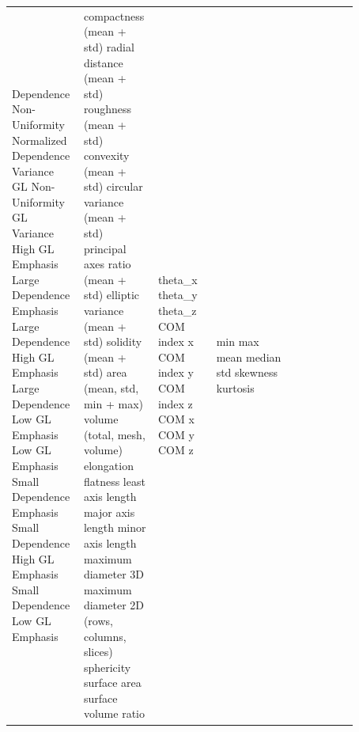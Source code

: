 \begin{table}
\begin{tabular}{@{}P{0.16\linewidth}P{0.16\linewidth}P{0.16\linewidth}P{0.21\linewidth}P{0.09\linewidth}P{0.09\linewidth}@{}}
Dependence Non-Uniformity Normalized \newline Dependence Variance \newline GL Non-Uniformity \newline GL Variance \newline High GL Emphasis \newline Large Dependence Emphasis \newline Large Dependence High GL Emphasis \newline Large Dependence Low GL Emphasis \newline Low GL Emphasis \newline Small Dependence Emphasis \newline Small Dependence High GL Emphasis \newline Small Dependence Low GL Emphasis & compactness (mean + std) \newline radial distance (mean + std) \newline roughness (mean + std) \newline convexity (mean + std) \newline circular variance (mean + std) \newline principal axes ratio (mean + std) \newline elliptic variance (mean + std) \newline solidity (mean + std) \newline area (mean, std, min + max) \newline volume (total, mesh, volume) \newline elongation \newline flatness \newline least axis length \newline major axis length \newline minor axis length \newline maximum diameter 3D \newline maximum diameter 2D (rows, columns, slices) \newline sphericity \newline surface area \newline surface volume ratio & theta\_x \newline theta\_y \newline theta\_z \newline COM index x \newline COM index y \newline COM index z \newline COM x \newline COM y \newline COM z & min \newline max \newline mean \newline median \newline std \newline skewness \newline kurtosis \newline 
\end{tabular}
\end{table}
